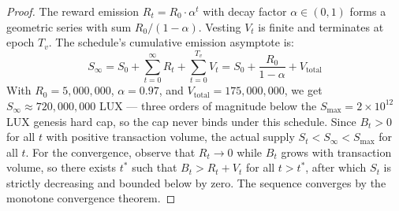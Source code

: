 \begin{proof}
The reward emission $R_t = R_0 \cdot \alpha^t$ with decay factor $\alpha \in (0,1)$ forms a geometric series with sum $R_0 / (1 - \alpha)$. Vesting $V_t$ is finite and terminates at epoch $T_v$. The schedule's cumulative emission asymptote is:
\begin{equation}
    S_{\infty} = S_0 + \sum_{t=0}^{\infty} R_t + \sum_{t=0}^{T_v} V_t = S_0 + \frac{R_0}{1-\alpha} + V_{\text{total}}
\end{equation}
With $R_0 = 5{,}000{,}000$, $\alpha = 0.97$, and $V_{\text{total}} = 175{,}000{,}000$, we get $S_{\infty} \approx 720{,}000{,}000$ LUX --- three orders of magnitude below the $S_{\max} = 2 \times 10^{12}$ LUX genesis hard cap, so the cap never binds under this schedule. Since $B_t > 0$ for all $t$ with positive transaction volume, the actual supply $S_t < S_{\infty} < S_{\max}$ for all $t$. For the convergence, observe that $R_t \to 0$ while $B_t$ grows with transaction volume, so there exists $t^*$ such that $B_t > R_t + V_t$ for all $t > t^*$, after which $S_t$ is strictly decreasing and bounded below by zero. The sequence converges by the monotone convergence theorem.
\end{proof}

